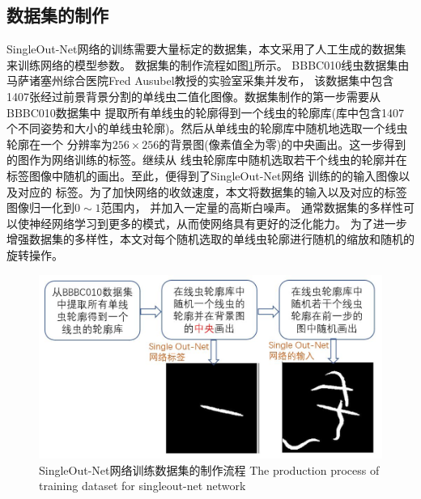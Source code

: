\subsection{数据集的制作}
\label{dataset}
	SingleOut-Net网络的训练需要大量标定的数据集，本文采用了人工生成的数据集来训练网络的模型参数。
	数据集的制作流程如图\ref{fig:chap4:dataset}所示。
	BBBC010线虫数据集\cite{Ljosa2012Annotated}由马萨诸塞州综合医院Fred Ausubel教授的实验室采集并发布，
	该数据集中包含1407张经过前景背景分割的单线虫二值化图像。数据集制作的第一步需要从BBBC010数据集中
	提取所有单线虫的轮廓得到一个线虫的轮廓库(库中包含1407个不同姿势和大小的单线虫轮廓)。然后从单线虫的轮廓库中随机地选取一个线虫轮廓在一个
	分辨率为$256\times256$的背景图(像素值全为零)的中央画出。这一步得到的图作为网络训练的标签。继续从
	线虫轮廓库中随机选取若干个线虫的轮廓并在标签图像中随机的画出。至此，便得到了SingleOut-Net网络
	训练的的输入图像以及对应的
	标签。为了加快网络的收敛速度，本文将数据集的输入以及对应的标签图像归一化到$0\sim1$范围内，
	并加入一定量的高斯白噪声。
	通常数据集的多样性可以使神经网络学习到更多的模式，从而使网络具有更好的泛化能力。
	为了进一步增强数据集的多样性，本文对每个随机选取的单线虫轮廓进行随机的缩放和随机的旋转操作。
	\begin{figure}[htb]
	  \centering
	  \includegraphics[width=12cm]{figure/chap4/dataset.jpg}
	  \bicaption
		{SingleOut-Net网络训练数据集的制作流程}
		{The production process of  training dataset for singleout-net network}
	  \label{fig:chap4:dataset}
	\end{figure}
